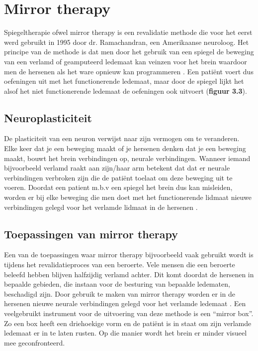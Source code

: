 \section{Mirror therapy}
Spiegeltherapie ofwel mirror therapy is een revalidatie methode die voor het eerst werd gebruikt in 1995 door dr. Ramachandran, een Amerikaanse neuroloog. Het principe van de methode is dat men door het gebruik van een spiegel de beweging van een verlamd of geamputeerd ledemaat kan veinzen voor het brein waardoor men de hersenen als het ware opnieuw kan programmeren \autocite{Physiopedia2019}.
Een patiënt voert dus oefeningen uit met het functionerende ledemaat, maar door de spiegel lijkt het alsof het niet functionerende ledemaat de oefeningen ook uitvoert (\textbf{figuur 3.3}).

\subsection{Neuroplasticiteit}
De plasticiteit van een neuron verwijst naar zijn vermogen om te veranderen. Elke keer dat je een beweging maakt of je hersenen denken dat je een beweging maakt, bouwt het brein verbindingen op, neurale verbindingen. Wanneer iemand bijvoorbeeld verlamd raakt aan zijn/haar arm betekent dat dat er neurale verbindingen verbroken zijn die de patiënt toelaat om deze beweging uit te voeren. Doordat een patient m.b.v een spiegel het brein dus kan misleiden, worden er bij elke beweging die men doet met het functionerende lidmaat nieuwe verbindingen gelegd voor het verlamde lidmaat in de hersenen \autocite{Saebo2018}.

\subsection{Toepassingen van mirror therapy}
Een van de toepassingen waar mirror therapy bijvoorbeeld vaak gebruikt wordt is tijdens het revalidatieproces van een beroerte.  Vele mensen die een beroerte beleefd hebben blijven halfzijdig verlamd achter. Dit komt doordat de hersenen in bepaalde gebieden, die instaan voor de besturing van bepaalde ledematen, beschadigd zijn. Door gebruik te maken van mirror therapy worden er in de hersenen nieuwe neurale verbindingen gelegd voor het verlamde ledemaat \autocite{Rehab2018}. Een veelgebruikt instrument voor de uitvoering van deze methode is een “mirror box”. Zo een box heeft een driehoekige vorm en de patiënt is in staat om zijn verlamde ledemaat er in te laten rusten. Op die manier wordt het brein er minder visueel mee geconfronteerd.

